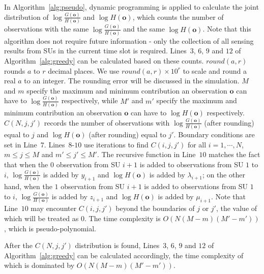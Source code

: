 \documentclass[conference]{IEEEtran}
\begin{document}
In Algorithm~\ref{alg:pseudo}, dynamic programming is applied to calculate the joint distribution of $\log{\frac{G(\boldsymbol{o})}{H(\boldsymbol{o})}}$ and $\log{H(\boldsymbol{o})}$, which counts the number of observations with the same $\log{\frac{G(\boldsymbol{o})}{H(\boldsymbol{o})}}$ and the same $\log{H(\boldsymbol{o})}$. Note that this algorithm does not require future information - only the collection of all sensing results from SUs in the current time slot is required. Lines~$3$, $6$, $9$ and $12$ of Algorithm~\ref{alg:greedy} can be calculated based on these counts. $round(a,r)$ rounds $a$ to $r$ decimal places. We use $round(a,r)\times 10^r$ to scale and round a real $a$ to an integer. The rounding error will be discussed in the simulation. $M$ and $m$ specify the maximum and minimum contribution an observation $\boldsymbol{o}$ can have to $\log{\frac{G(\boldsymbol{o})}{H(\boldsymbol{o})}}$ respectively, while $M'$ and $m'$ specify the maximum and minimum contribution an observation $\boldsymbol{o}$ can have to $\log{H(\boldsymbol{o})}$ respectively. $C(N,j,j')$ records the number of observations with $\log{\frac{G(\boldsymbol{o})}{H(\boldsymbol{o})}}$ (after rounding) equal to $j$ and $\log{H(\boldsymbol{o})}$ (after rounding) equal to $j'$. Boundary conditions are set in Line~$7$. Lines~$8$-$10$ use iterations to find $C(i,j,j')$ for all $i=1,\cdots,N$, $m\le j\le M$ and $m'\le j'\le M'$. The recursive function in Line~$10$ matches the fact that when the $0$ observation from SU $i+1$ is added to observations from SU $1$ to $i$, $\log{\frac{G(\boldsymbol{o})}{H(\boldsymbol{o})}}$ is added by $y_{i+1}$ and $\log{H(\boldsymbol{o})}$ is added by ${\lambda}_{i+1}$; on the other hand, when the $1$ observation from SU $i+1$ is added to observations from SU $1$ to $i$, $\log{\frac{G(\boldsymbol{o})}{H(\boldsymbol{o})}}$ is added by $z_{i+1}$ and $\log{H(\boldsymbol{o})}$ is added by ${\mu}_{i+1}$. Note that Line~$10$ may encounter $C(i,j,j')$ beyond the boundaries of $j$ or $j'$, the value of which will be treated as $0$. The time complexity is $O(N(M-m)(M'-m'))$, which is pseudo-polynomial.

After the $C(N,j,j')$ distribution is found, Lines~$3$, $6$, $9$ and $12$ of Algorithm~\ref{alg:greedy} can be calculated accordingly, the time complexity of which is dominated by $O(N(M-m)(M'-m'))$. 
\end{document}
